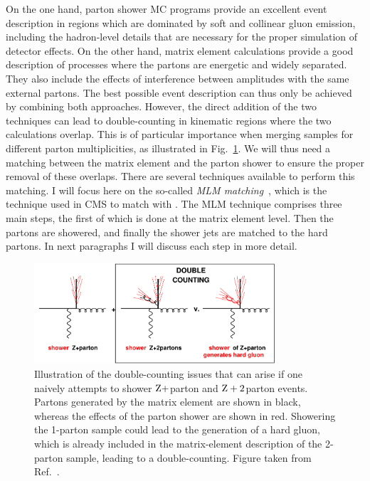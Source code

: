 On the one hand, parton shower MC programs provide an excellent event description in regions which
are dominated by soft and collinear gluon emission, including the hadron-level details that are
necessary for the proper simulation of detector effects. 
On the other hand, matrix element calculations provide a good description of processes where
the partons are energetic and widely separated. They also include the effects of
interference between amplitudes with the same external partons. 
The best possible event description can thus only be achieved by combining both approaches.
However, the direct addition of the two techniques can lead to double-counting in kinematic regions
where the two calculations overlap. This is of particular importance when merging samples for
different parton multiplicities, as illustrated in Fig.~\ref{fig:overlap}.
We will thus need a matching between the matrix element
and the parton shower to ensure the proper removal of these overlaps.
There are several techniques available to perform this matching. I will focus here on the so-called
\textit{MLM matching}~\cite{Alwall:2007fs}, which is the technique used in CMS to match \MADGRAPH
with \PYTHIA. The MLM technique comprises three main steps, the first of which is done at the
matrix element level. Then the partons are showered, and finally the shower jets are matched to the
hard partons. 
In next paragraphs I will discuss each step in more detail. 


\begin{figure}[t]
  \centering
  \includegraphics[width=0.8\textwidth]{figures/eventreco_generation/overlap}
  \caption{ Illustration of the double-counting issues that can arise if one naively attempts to
shower $\mathrm{Z}+$parton and $\mathrm{Z}+2$parton events. Partons generated by the matrix element are
shown in black, whereas the effects of the parton shower are shown in red. Showering the 1-parton
sample could lead to the generation of a hard gluon, which is already included in the matrix-element
description of the 2-parton sample, leading to a double-counting. Figure taken from
Ref.~\cite{Salam:2010zt}. 
  \label{fig:overlap}}
\end{figure}


